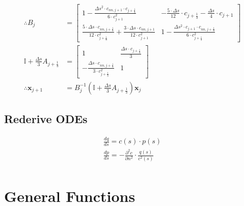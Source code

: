 \documentclass{article}
\begin{document}
\begin{align*}
	\therefore B_j                                   & = \begin{bmatrix} 1-\frac{\Delta s^2\cdot c_{nn, j+1}\cdot c_{j+\frac{1}{3}}}{6\cdot c_{j+1}^2} & - \frac{5\cdot\Delta s}{12}\cdot c_{j+\frac{1}{3}} - \frac{\Delta s}{4}\cdot c_{j+1} \\ \frac{5\cdot\Delta s\cdot c_{nn, j+\frac{1}{3}}}{12\cdot c_{j+\frac{1}{3}}^2} + \frac{3\cdot\Delta s\cdot c_{nn, j+1}}{12\cdot c_{j+1}^2} & 1- \frac{\Delta s^2\cdot c_{j+1}\cdot c_{nn, j+\frac{1}{3}}}{6\cdot c_{j+\frac{1}{3}}^2} \end{bmatrix}                        \\
	\mathbb{I} + \frac{\Delta s}{3}A_{j+\frac{1}{3}} & = \begin{bmatrix} 1 & \frac{\Delta s\cdot c_{j+\frac{1}{3}}}{3} \\ -\frac{\Delta s\cdot c_{nn, j+\frac{1}{3}}}{3\cdot c_{j+\frac{1}{3}}^2} & 1 \end{bmatrix}                                                                                                                                                                                                                                                                                                                                                                                                                                                            \\
	\therefore \bm{x}_{j+1}                          & = B_j^{-1}\left(\mathbb{I} + \frac{\Delta s}{3}A_{j+\frac{1}{3}} \right)\bm{x}_j
\end{align*}

\subsection{Rederive ODEs}
\begin{align*}
	\frac{dq}{ds} = c(s)\cdot p(s)                                             \\
	\frac{dp}{ds} = -\frac{\partial^2 c}{\partial n^2}\cdot\frac{q(s)}{c^2(s)} \\
\end{align*}

\section{General Functions}
\end{document}
